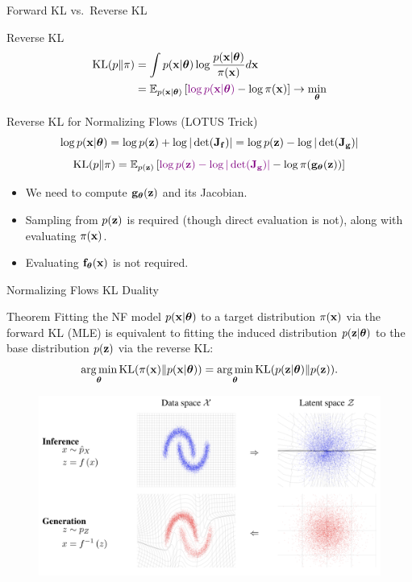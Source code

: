 \documentclass{beamer}
\begin{document}
\begin{frame}{Forward KL vs.\ Reverse KL}
	\begin{block}{Reverse KL}
	  	\vspace{-0.5cm}
			\begin{align*}
				\mathrm{KL}(p \| \pi) &= \int p(\mathbf{x} | \boldsymbol{\theta}) \log \frac{p(\mathbf{x} | \boldsymbol{\theta})}{\pi(\mathbf{x})} d \mathbf{x} \\
				&= \mathbb{E}_{p(\mathbf{x} | \boldsymbol{\theta})} \left[{\color{violet}\log p(\mathbf{x} | \boldsymbol{\theta})} - \log \pi(\mathbf{x})\right] \rightarrow \min_{\boldsymbol{\theta}}
			\end{align*}
		\vspace{-0.7cm}
	\end{block}
	\begin{block}{Reverse KL for Normalizing Flows (LOTUS Trick)}
  		\vspace{-0.3cm}
		\[
			 \log p(\mathbf{x} | \boldsymbol{\theta}) = \log p(\mathbf{z}) +  \log  |\det (\mathbf{J}_{\mathbf{f}})| = \log p(\mathbf{z}) - \log |\det (\mathbf{J}_{\mathbf{g}})| 
		\]
		\[
			\mathrm{KL}(p \| \pi)  = \mathbb{E}_{p(\mathbf{z})} \left[ {\color{violet} \log p(\mathbf{z}) -  \log |\det (\mathbf{J}_{\mathbf{g}})| } - \log \pi(\mathbf{g}_{\boldsymbol{\theta}}(\mathbf{z})) \right]
		\]
		\vspace{-0.3cm}
		\begin{itemize}
		\item We need to compute $\mathbf{g}_{\boldsymbol{\theta}}(\mathbf{z})$ and its Jacobian.
		\item Sampling from $p(\mathbf{z})$ is required (though direct evaluation is not), along with evaluating $\pi(\mathbf{x})$.
		\item Evaluating $\mathbf{f}_{\boldsymbol{\theta}}(\mathbf{x})$ is not required.
		\end{itemize}
	\end{block}
\end{frame}
\begin{frame}{Normalizing Flows KL Duality}
	\begin{block}{Theorem}
		Fitting the NF model $p(\mathbf{x}| \boldsymbol{\theta})$ to a target distribution $\pi(\mathbf{x})$ via the forward KL (MLE) is equivalent to fitting the induced distribution $p(\mathbf{z}| \boldsymbol{\theta})$ to the base distribution $p(\mathbf{z})$ via the reverse KL:
		\vspace{-0.2cm}
		\[
			\operatorname*{arg\,min}_{\boldsymbol{\theta}} \mathrm{KL}(\pi(\mathbf{x}) \| p(\mathbf{x} | \boldsymbol{\theta})) = \operatorname*{arg\,min}_{\boldsymbol{\theta}} \mathrm{KL}(p(\mathbf{z} | \boldsymbol{\theta}) \| p(\mathbf{z})).
		\]
		\vspace{-0.9cm}
	\end{block}
	\begin{figure}
		\includegraphics[width=0.85\linewidth]{figs/flows_how2}
	\end{figure}
\end{frame}
\end{document}
